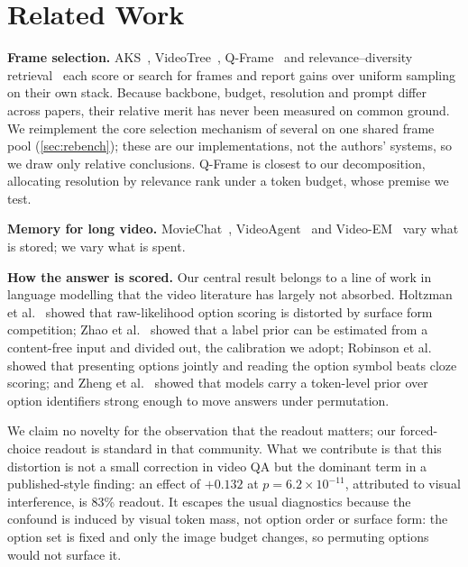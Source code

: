 \documentclass[10pt,twocolumn,letterpaper]{article}
\begin{document}
\section{Related Work}
\label{sec:related}

\noindent\textbf{Frame selection.} AKS~\cite{tang2025aks}, VideoTree~\cite{wang2025videotree}, Q-Frame~\cite{zhang2025qframe} and relevance--diversity retrieval~\cite{carbonell1998mmr} each score or search for frames and report gains over uniform sampling on their own stack. Because backbone, budget, resolution and prompt differ across papers, their relative merit has never been measured on common ground. We reimplement the core selection mechanism of several on one shared frame pool (\cref{sec:rebench}); these are our implementations, not the authors' systems, so we draw only relative conclusions. Q-Frame is closest to our decomposition, allocating resolution by relevance rank under a token budget, whose premise we test.

\noindent\textbf{Memory for long video.} MovieChat~\cite{song2024moviechat}, VideoAgent~\cite{wang2024videoagent} and Video-EM~\cite{wang2025videoem} vary what is stored; we vary what is spent.

\noindent\textbf{How the answer is scored.} Our central result belongs to a line of work in language modelling that the video literature has largely not absorbed. Holtzman et al.~\cite{holtzman2021surface} showed that raw-likelihood option scoring is distorted by surface form competition; Zhao et al.~\cite{zhao2021calibrate} showed that a label prior can be estimated from a content-free input and divided out, the calibration we adopt; Robinson et al.~\cite{robinson2023mcqa} showed that presenting options jointly and reading the option symbol beats cloze scoring; and Zheng et al.~\cite{zheng2024notrobust} showed that models carry a token-level prior over option identifiers strong enough to move answers under permutation.

We claim no novelty for the observation that the readout matters; our forced-choice readout is standard in that community. What we contribute is that this distortion is not a small correction in video QA but the dominant term in a published-style finding: an effect of $+0.132$ at $p{=}6.2{\times}10^{-11}$, attributed to visual interference, is 83\% readout. It escapes the usual diagnostics because the confound is induced by visual token mass, not option order or surface form: the option set is fixed and only the image budget changes, so permuting options~\cite{zheng2024notrobust} would not surface it.
\end{document}
